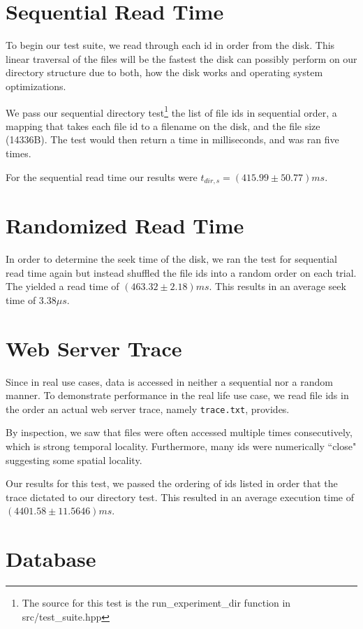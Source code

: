 \documentclass[notitlepage, twocolumn,11pt]{article}
\begin{document}
\section{Sequential Read Time}

To begin our test suite, we read through each id in order from the disk.
This linear traversal of the files will be the fastest the disk can possibly perform on our directory structure due to both, how the disk works and operating system optimizations.

We pass our sequential directory test\footnote{The source for this test is the run\_experiment\_dir function in src/test\_suite.hpp} the list of file ids in sequential order, a mapping that takes each file id to a filename on the disk, and the file size (14336B).
The test would then return a time in milliseconds, and was ran five times.

For the sequential read time our results were $t_{dir,s}=(415.99 \pm 50.77)ms$.

\section{Randomized Read Time}

In order to determine the seek time of the disk, we ran the test for sequential read time again but instead shuffled the file ids into a random order on each trial.
The yielded a read time of $(463.32 \pm 2.18)ms$.
This results in an average seek time of $3.38\mu s$.

\section{Web Server Trace}

Since in real use cases, data is accessed in neither a sequential nor a random manner.
To demonstrate performance in the real life use case, we read file ids in the order an actual web server trace, namely \verb|trace.txt|, provides.

By inspection, we saw that files were often accessed multiple times consecutively, which is strong temporal locality.
Furthermore, many ids were numerically ``close" suggesting some spatial locality.

Our results for this test, we passed the ordering of ids listed in order that the trace dictated to our directory test.
This resulted in an average execution time of $(4401.58 \pm 11.5646)ms$.

\section{Database}
\end{document}
